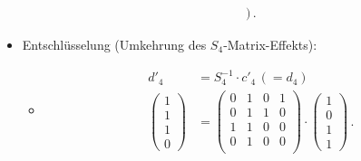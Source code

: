 \begin{itemize}
\begin{itemize}
\begin{align*}
            \text{)}
            \,.
        \end{align*}
    \end{itemize}
    \item Entschlüsselung (Umkehrung des $S_4$-Matrix-Effekts):
    \begin{itemize}
        \item[]
        \begin{align*}
            d'_{4}&=S_{4}^{-1} \cdot c'_4 \,(= d_4)\\
            \begin{pmatrix}
                1\\
                1\\
                1\\
                0
            \end{pmatrix}
            &=
            \begin{pmatrix} %
                0 & 1 & 0 & 1\\
                0 & 1 & 1 & 0\\
                1 & 1 & 0 & 0\\
                0 & 1 & 0 & 0\\
            \end{pmatrix}
            \cdot
            \begin{pmatrix} %
                1\\
                0\\
                1\\
                1
            \end{pmatrix}
            \,.
        \end{align*}
    \end{itemize}
\end{itemize}


